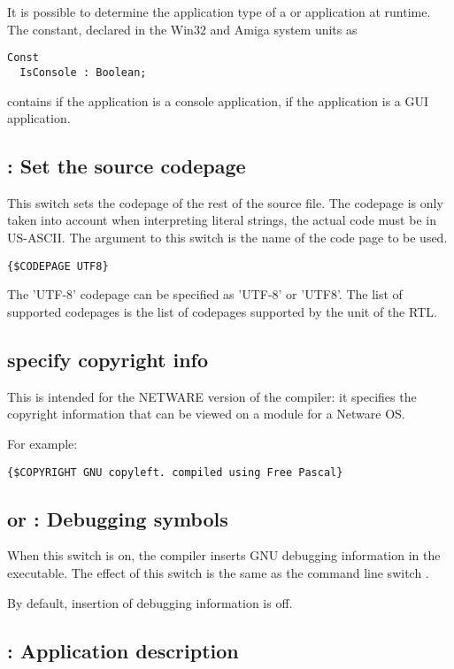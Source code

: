 It is possible to determine the application type of a \windows or \amiga application
at runtime. The  constant, declared in the Win32 and Amiga
system units as
\begin{verbatim}
Const
  IsConsole : Boolean;
\end{verbatim}
contains  if the application is a console application, 
if the application is a GUI application.

\subsection{ : Set the source codepage}
This switch sets the codepage of the rest of the source file. 
The codepage is only taken into account when interpreting literal 
strings, the actual code must be in US-ASCII. The argument to this switch is the name of the code page to be used.
\begin{verbatim}
{$CODEPAGE UTF8}
\end{verbatim}
The 'UTF-8' codepage can be specified as 'UTF-8' or 'UTF8'.
The list of supported codepages is the list of codepages
supported by the  unit of the RTL.

\subsection{ specify copyright info}
This is intended for the NETWARE version of the compiler: it specifies the
copyright information that can be viewed on a module for a Netware OS.

For example:
\begin{verbatim}
{$COPYRIGHT GNU copyleft. compiled using Free Pascal}
\end{verbatim}


\subsection{ or  : Debugging symbols}

When this switch is on,
the compiler inserts GNU debugging information in
the executable. The effect of this switch is the same as the command line
switch .

By default, insertion of debugging information is off.

\subsection{ : Application description}

